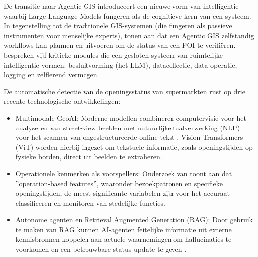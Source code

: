 De transitie naar Agentic GIS introduceert een nieuwe vorm van intelligentie waarbij Large Language Models fungeren als de cognitieve kern van een systeem. In tegenstelling tot de traditionele GIS-systemen (die fungeren als passieve instrumenten voor menselijke experts), tonen \textcite{Li2025} aan dat een Agentic GIS zelfstandig workflows kan plannen en uitvoeren om de status van een POI te verifiëren. \textcite{Li2023} bespreken vijf kritieke modules die een gesloten systeem van ruimtelijke intelligentie vormen: besluitvorming (het LLM), datacollectie, data-operatie, logging en zelflerend vermogen.

De automatische detectie van de openingsstatus van supermarkten rust op drie recente technologische ontwikkelingen:

\begin{itemize}
    \item Multimodale GeoAI: Moderne modellen combineren computervisie voor het analyseren van street-view beelden met natuurlijke taalverwerking (NLP) voor het scannen van ongestructureerde online tekst \autocite{Mai2025}. Vision Transformers (ViT) worden hierbij ingezet om tekstuele informatie, zoals openingstijden op fysieke borden, direct uit beelden te extraheren.
    \item Operationele kenmerken als voorspellers: Onderzoek van \textcite{Milias2021} toont aan dat ''operation-based features'', waaronder bezoekpatronen en specifieke openingstijden, de meest significante variabelen zijn voor het accuraat classificeren en monitoren van stedelijke functies.
    \item Autonome agenten en Retrieval Augmented Generation (RAG): Door gebruik te maken van RAG kunnen AI-agenten feitelijke informatie uit externe kennisbronnen koppelen aan actuele waarnemingen om hallucinaties te voorkomen en een betrouwbare status update te geven \autocite{Boutayeb2024}.
\end{itemize}


